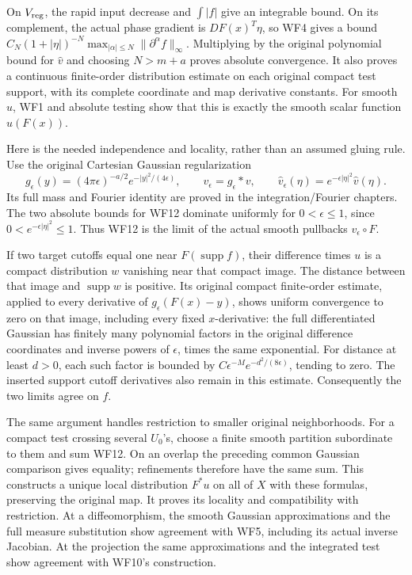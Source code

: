 \documentclass[
  11pt,
]{article}
\begin{document}
On \(V_{\rm reg}\), the rapid input decrease and \(\int|f|\) give an
integrable bound. On its complement, the actual phase gradient is
\(DF(x)^T\eta\), so WF4 gives a bound
\(C_N(1+|\eta|)^{-N}\max_{|\alpha|\leq N}\|\partial^\alpha f\|_\infty\).
Multiplying by the original polynomial bound for \(\widehat v\) and
choosing \(N>m+a\) proves absolute convergence. It also proves a
continuous finite-order distribution estimate on each original compact
test support, with its complete coordinate and map derivative constants.
For smooth \(u\), WF1 and absolute testing show that this is exactly the
smooth scalar function \(u(F(x))\).

Here is the needed independence and locality, rather than an assumed
gluing rule. Use the original Cartesian Gaussian regularization \[
g_\epsilon(y)=(4\pi\epsilon)^{-a/2}
      e^{-|y|^2/(4\epsilon)},\qquad
v_\epsilon=g_\epsilon*v,\qquad
\widehat v_\epsilon(\eta)=e^{-\epsilon|\eta|^2}\widehat v(\eta).
\tag{WF13}
\] Its full mass and Fourier identity are proved in the
integration/Fourier chapters. The two absolute bounds for WF12 dominate
uniformly for \(0<\epsilon\leq1\), since
\(0<e^{-\epsilon|\eta|^2}\leq1\). Thus WF12 is the limit of the actual
smooth pullbacks \(v_\epsilon\circ F\).

If two target cutoffs equal one near \(F(\operatorname{supp}f)\), their
difference times \(u\) is a compact distribution \(w\) vanishing near
that compact image. The distance between that image and
\(\operatorname{supp}w\) is positive. Its original compact finite-order
estimate, applied to every derivative of \(g_\epsilon(F(x)-y)\), shows
uniform convergence to zero on that image, including every fixed
\(x\)-derivative: the full differentiated Gaussian has finitely many
polynomial factors in the original difference coordinates and inverse
powers of \(\epsilon\), times the same exponential. For distance at
least \(d>0\), each such factor is bounded by
\(C\epsilon^{-M}e^{-d^2/(8\epsilon)}\), tending to zero. The inserted
support cutoff derivatives also remain in this estimate. Consequently
the two limits agree on \(f\).

The same argument handles restriction to smaller original neighborhoods.
For a compact test crossing several \(U_0\)'s, choose a finite smooth
partition subordinate to them and sum WF12. On an overlap the preceding
common Gaussian comparison gives equality; refinements therefore have
the same sum. This constructs a unique local distribution \(F^*u\) on
all of \(X\) with these formulas, preserving the original map. It proves
its locality and compatibility with restriction. At a diffeomorphism,
the smooth Gaussian approximations and the full measure substitution
show agreement with WF5, including its actual inverse Jacobian. At the
projection the same approximations and the integrated test show
agreement with WF10's construction.
\end{document}
